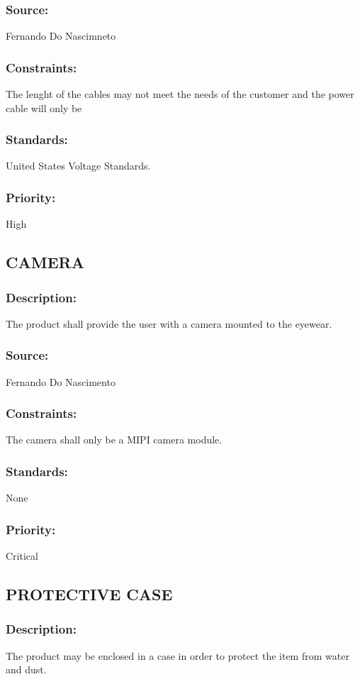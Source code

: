\subsubsection{Source:} 
	{Fernando Do Nascimneto}
\subsubsection{Constraints:} 
	{The lenght of the cables may not meet the needs of the customer and the power cable will only be}
\subsubsection{Standards:} 
	{United States Voltage Standards.}
\subsubsection{Priority:} 
	{High}

\subsection{\text CAMERA}
\subsubsection{Description:} 
{The product shall provide the user with a camera mounted to the eyewear.}
\subsubsection{Source:} 
	{Fernando Do Nascimento}
\subsubsection{Constraints:} 
	{The camera shall only be a MIPI camera module.}
\subsubsection{Standards:} 
	{None}
\subsubsection{Priority:} 
	{Critical}

\subsection{\text PROTECTIVE CASE }
\subsubsection{Description:} 
	{The product may be enclosed in a case in order to protect the item from water and dust.}
